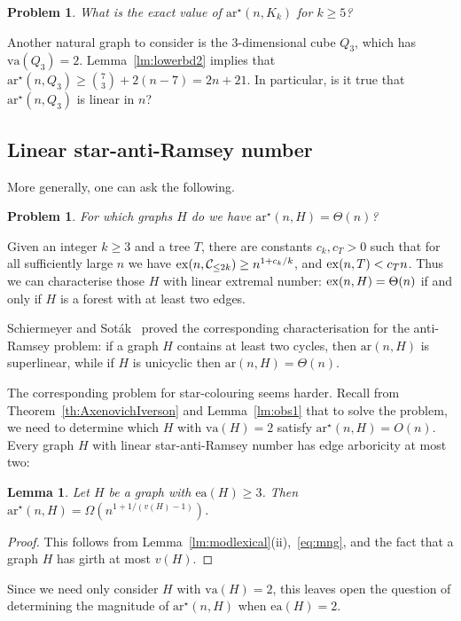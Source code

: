 \documentclass[a4paper, 12pt]{article}
\numberwithin{equation}{section}
\newtheorem{problem}[theorem]{Problem}
\newtheorem{lemma}[theorem]{Lemma}
\def\ar{{\mathrm{ar}}}
\def\sar{{\mathrm{ar}^{\star}}}
\def\ea{{\mathrm{ea}}}
\def\va{{\mathrm{va}}}
\newcommand{\mc}[1]{\mathcal{#1}}
\begin{document}
\begin{problem}
    What is the exact value of $\sar(n,K_k)$ for $k \geq 5$?
\end{problem}

Another natural graph to consider is the $3$-dimensional cube $Q_3$, which has $\va(Q_3)=2$.
Lemma~\ref{lm:lowerbd2} implies that $\sar(n,Q_3) \geq \binom{7}{3}+2(n-7) = 2n+21$.
In particular, is it true that $\sar(n,Q_3)$ is linear in $n$?


\subsection{Linear star-anti-Ramsey number}
More generally, one can ask the following.

\begin{problem}
    For which graphs $H$ do we have $\sar(n,H)=\Theta(n)$?
\end{problem}


Given an integer $k \geq 3$ and a tree $T$, there are constants $c_k,c_T>0$ such that for all sufficiently large $n$ we have ${\rm ex}(n,\mc{C}_{\leq 2k}) \geq n^{1+c_k/k}$, and ${\rm ex}(n,T) < c_T n$.
Thus we can characterise those $H$ with linear extremal number: ${\rm ex}(n,H)=\Theta(n)$ if and only if $H$ is a forest with at least two edges.

Schiermeyer and Sot\'ak~\cite{SchiermeyerSotak} proved the corresponding characterisation for the anti-Ramsey problem: if a graph $H$ contains at least two cycles, then $\ar(n,H)$ is superlinear, while if $H$ is unicyclic then $\ar(n,H)=\Theta(n)$.


The corresponding problem for star-colouring seems harder.
Recall from Theorem~\ref{th:AxenovichIverson} and Lemma~\ref{lm:obs1} that to solve the problem, we need to determine which $H$ with $\va(H)=2$ satisfy $\sar(n,H) = O(n)$.
Every graph $H$ with linear star-anti-Ramsey number has edge arboricity at most two:

\begin{lemma}\label{lm:ea3}
    Let $H$ be a graph with $\ea(H) \geq 3$. Then $\sar(n,H) = \Omega(n^{1+1/(v(H)-1)})$.
\end{lemma}

\begin{proof}
This follows from Lemma~\ref{lm:modlexical}(ii),~\eqref{eq:mng}, and the fact that a graph $H$ has girth at most $v(H)$.
\end{proof}

Since we need only consider $H$ with $\va(H) = 2$, this leaves open the question of determining the magnitude of $\sar(n,H)$ when $\ea(H)=2$.
\end{document}
